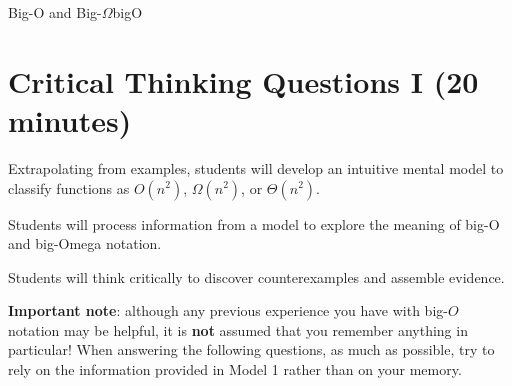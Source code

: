 \documentclass{tufte-handout}
\begin{document}
\begin{model}{Big-O and Big-$\Omega$}{bigO}
\begin{center}
\begin{minipage}{\textwidth}
\end{minipage}

\end{center}
\end{model}

\newpage
\section{Critical Thinking Questions I (20 minutes)}

\begin{objective}
  Extrapolating from examples, students will develop an intuitive mental
  model to classify functions as $O(n^2)$, $\Omega(n^2)$, or
  $\Theta(n^2)$.
\end{objective}

\begin{pobjective}
  Students will process information from a model to explore the
  meaning of big-O and big-Omega notation.
\end{pobjective}

\begin{pobjective}
  Students will think critically to discover counterexamples
  and assemble evidence.
\end{pobjective}

\textbf{Important note}: although any previous experience you have
with big-$O$ notation may be helpful, it is \textbf{not} assumed that
you remember anything in particular!  When answering the following
questions, as much as possible, try to rely on the information
provided in Model 1 rather than on your memory.
\end{document}
